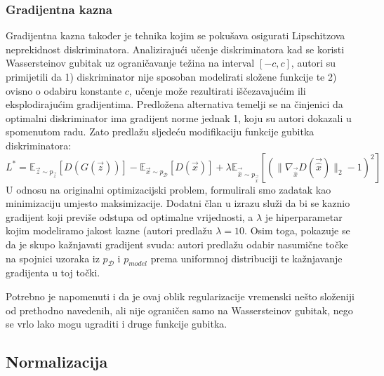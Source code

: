 \subsubsection{Gradijentna kazna}
Gradijentna kazna   također je tehnika kojim se pokušava osigurati Lipschitzova neprekidnost diskriminatora. Analizirajući učenje diskriminatora kad se koristi Wassersteinov gubitak uz ograničavanje težina na interval $[-c, c]$, autori su primijetili da 1) diskriminator nije sposoban modelirati složene funkcije te 2) ovisno o odabiru konstante $c$, učenje može rezultirati iščezavajućim ili eksplodirajućim gradijentima. Predložena alternativa temelji se na činjenici da optimalni diskriminator ima gradijent norme jednak 1, koju su autori dokazali u spomenutom radu. Zato predlažu sljedeću modifikaciju funkcije gubitka diskriminatora:
\begin{equation}
L^* = \mathbb{E}_{\vec{z} \sim p_{\vec{z}}}\left[D(G(\vec{z}))\right] - \mathbb{E}_{\vec{x} \sim p_{\mathcal{D}}} \left[D(\vec{x})\right] + \lambda \mathbb{E}_{\vec{\hat{x}} \sim p_{\vec{\hat{x}}}} \left[\left(\|\nabla_{\vec{\hat{x}}} D(\vec{\hat{x}})\|_2 - 1 \right) ^2 \right] 
\end{equation}
U odnosu na originalni optimizacijski problem, formulirali smo zadatak kao minimizaciju umjesto maksimizacije. Dodatni član u izrazu služi da bi se kaznio gradijent koji previše odstupa od optimalne vrijednosti, a $\lambda$ je hiperparametar kojim modeliramo jakost kazne (autori predlažu $\lambda = 10$. Osim toga, pokazuje se da je skupo kažnjavati gradijent svuda: autori predlažu odabir nasumične točke na spojnici uzoraka iz $p_{\mathcal{D}}$ i $p_{model}$ prema uniformnoj distribuciji te kažnjavanje gradijenta u toj točki. 

Potrebno je napomenuti i da je ovaj oblik regularizacije vremenski nešto složeniji od prethodno navedenih, ali nije ograničen samo na Wassersteinov gubitak, nego se vrlo lako mogu ugraditi i druge funkcije gubitka.

\subsection{Normalizacija}
